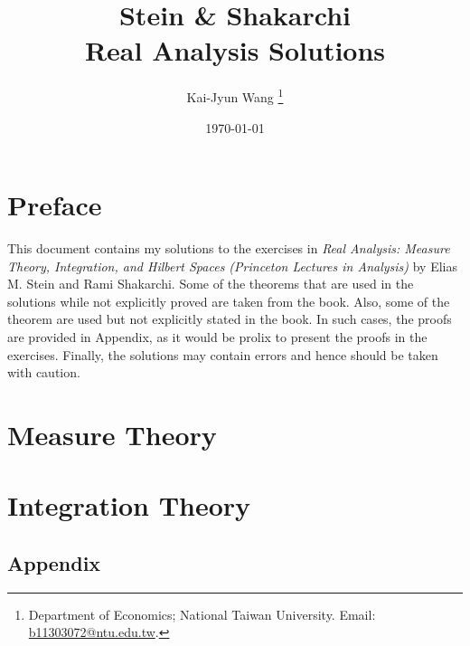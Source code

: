 \documentclass[12pt]{article}
\title{
    Stein \& Shakarchi \\
    Real Analysis Solutions
    }
\author{%
   Kai-Jyun Wang
   \thanks{Department of Economics; National Taiwan University. 
   Email: \url{b11303072@ntu.edu.tw}.}
}
\date{\today}
\begin{document}

\maketitle

\section*{Preface}
This document contains my solutions to the exercises in 
\textit{Real Analysis: Measure Theory, Integration, and 
Hilbert Spaces (Princeton Lectures in Analysis)} by 
Elias M. Stein and Rami Shakarchi. Some of the theorems
that are used in the solutions while not explicitly proved 
are taken from the book. Also, some of the theorem are used 
but not explicitly stated in the book. In such cases, the 
proofs are provided in Appendix, as it would be prolix to 
present the proofs in the exercises. Finally, the solutions 
may contain errors and hence should be taken with caution.

\newpage
\textbf{\tableofcontents}
\newpage

\section{Measure Theory}







\newpage
\section{Integration Theory}






\newpage
\begin{appendices}
    \section{Appendix}
    
\end{appendices}
\end{document}
